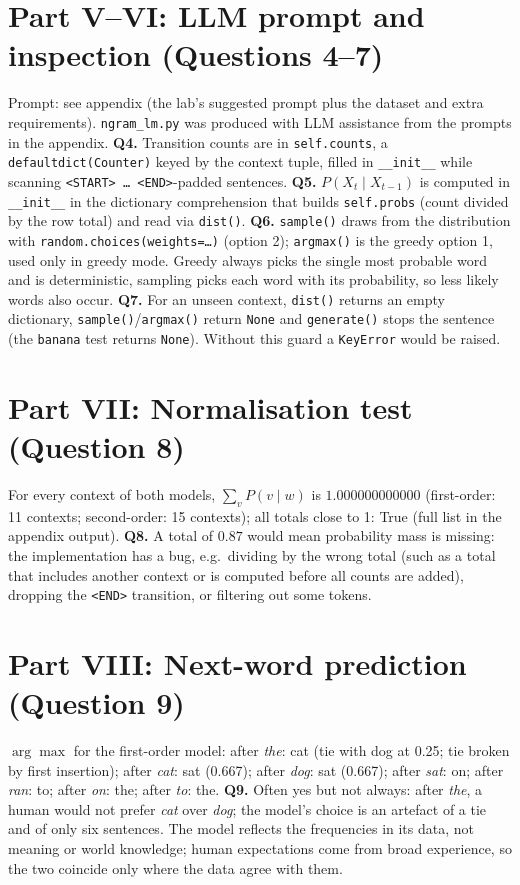 \documentclass[10pt,a4paper]{article}
\begin{document}
\section*{Part V--VI: LLM prompt and inspection (Questions 4--7)}
Prompt: see appendix (the lab's suggested prompt plus the dataset and extra requirements). \texttt{ngram\_lm.py} was produced with LLM assistance from the prompts in the appendix.
\textbf{Q4.} Transition counts are in \texttt{self.counts}, a \texttt{defaultdict(Counter)} keyed by the context tuple, filled in \texttt{\_\_init\_\_} while scanning \texttt{<START> \dots\ <END>}-padded sentences.
\textbf{Q5.} $P(X_t\mid X_{t-1})$ is computed in \texttt{\_\_init\_\_} in the dictionary comprehension that builds \texttt{self.probs} (count divided by the row total) and read via \texttt{dist()}.
\textbf{Q6.} \texttt{sample()} draws from the distribution with \texttt{random.choices(weights=\dots)} (option 2); \texttt{argmax()} is the greedy option 1, used only in greedy mode. Greedy always picks the single most probable word and is deterministic, sampling picks each word with its probability, so less likely words also occur.
\textbf{Q7.} For an unseen context, \texttt{dist()} returns an empty dictionary, \texttt{sample()}/\texttt{argmax()} return \texttt{None} and \texttt{generate()} stops the sentence (the \texttt{banana} test returns \texttt{None}). Without this guard a \texttt{KeyError} would be raised.

\section*{Part VII: Normalisation test (Question 8)}
For every context of both models, $\sum_v P(v\mid w)$ is $1.000000000000$ (first-order: 11 contexts; second-order: 15 contexts); all totals close to 1: True (full list in the appendix output). \textbf{Q8.} A total of $0.87$ would mean probability mass is missing: the implementation has a bug, e.g.\ dividing by the wrong total (such as a total that includes another context or is computed before all counts are added), dropping the \texttt{<END>} transition, or filtering out some tokens.

\section*{Part VIII: Next-word prediction (Question 9)}
$\arg\max$ for the first-order model: after \emph{the}: cat (tie with dog at 0.25; tie broken by first insertion); after \emph{cat}: sat (0.667); after \emph{dog}: sat (0.667); after \emph{sat}: on; after \emph{ran}: to; after \emph{on}: the; after \emph{to}: the.
\textbf{Q9.} Often yes but not always: after \emph{the}, a human would not prefer \emph{cat} over \emph{dog}; the model's choice is an artefact of a tie and of only six sentences. The model reflects the frequencies in its data, not meaning or world knowledge; human expectations come from broad experience, so the two coincide only where the data agree with them.
\end{document}

